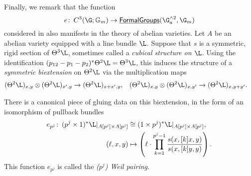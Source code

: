 Finally, we remark that the function \[e\co C^3(\G; \Gm) \to \InternalHom{FormalGroups}(\G_a^{\sm 2}, \G_m)\] considered in  also manifests in the theory of abelian varieties.  Let $A$ be an abelian variety equipped with a line bundle $\L$.  Suppose that $s$ is a symmetric, rigid section of $\Theta^3 \L$, sometimes called a \textit{cubical structure on $\L$}.  Using the identification $(p_{12} - p_1 - p_2)^* \Theta^2 \L = \Theta^3 \L$, this induces the structure of a \textit{symmetric biextension} on $\Theta^2 \L$ via the multiplication maps
\begin{align*}
(\Theta^2 \L)_{x, y} \otimes (\Theta^2 \L)_{x', y} & \to (\Theta^2 \L)_{x + x', y}, &
(\Theta^2 \L)_{x, y} \otimes (\Theta^2 \L)_{x, y'} & \to (\Theta^2 \L)_{x, y + y'}.
\end{align*}

\begin{definition}
There is a canonical piece of gluing data on this biextension, in the form of an isomorphism of pullback bundles
\begin{align*}
e_{p^j}\co (p^j \times 1)^* \L|_{A[p^j] \times A[p^j]} & \cong (1 \times p^j)^* \L|_{A[p^j] \times A[p^j]}, \\
(\ell, x, y) & \mapsto \left(\ell \cdot \prod_{k=1}^{p^j-1} \frac{s(x, [k]x, y)}{s(x, [k]y, y)} \right).
\end{align*}
This function $e_{p^j}$ is called the \textit{($p^j$){\th} Weil pairing}.
\end{definition}


